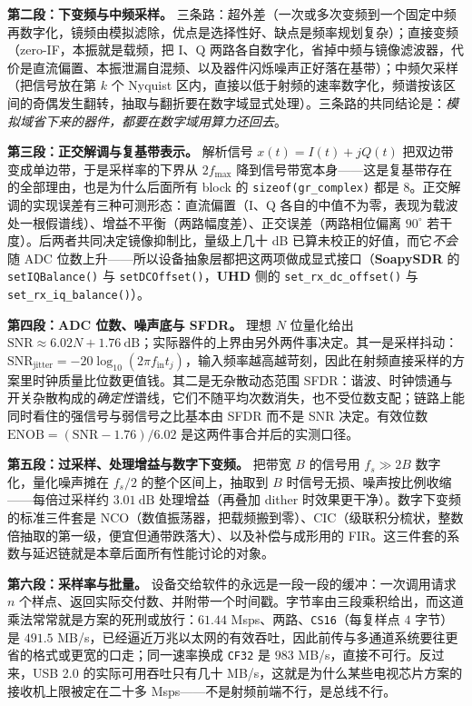\documentclass[12pt,a4paper,fontset=fandol]{ctexbook}
\newcommand{\Fn}[1]{\texttt{#1()}}
\newcommand{\Tp}[1]{\texttt{#1}}
\newcommand{\Bk}{\allowbreak}
\newcommand{\Lib}[1]{\textbf{#1}}
\begin{document}
\textbf{第二段：下变频与中频采样。} 三条路：超外差（一次或多次变频到一个固定中频再数字化，镜频由模拟滤除，优点是选择性好、缺点是频率规划复杂）；直接变频（zero-IF，本振就是载频，把 I、Q 两路各自数字化，省掉中频与镜像滤波器，代价是直流偏置、本振泄漏自混频、以及器件闪烁噪声正好落在基带）；中频欠采样（把信号放在第 $k$ 个 Nyquist 区内，直接以低于射频的速率数字化，频谱按该区间的奇偶发生翻转，抽取与翻折要在数字域显式处理）。三条路的共同结论是：\emph{模拟域省下来的器件，都要在数字域用算力还回去}。

\textbf{第三段：正交解调与复基带表示。} 解析信号 $x(t) = I(t) + jQ(t)$ 把双边带变成单边带，于是采样率的下界从 $2 f_{\max}$ 降到信号带宽本身——这是复基带存在的全部理由，也是为什么后面所有 block 的 \Tp{sizeof(gr\_complex)} \Bk{} 都是 $8$。正交解调的实现误差有三种可测形态：直流偏置（I、Q 各自的中值不为零，表现为载波处一根假谱线）、增益不平衡（两路幅度差）、正交误差（两路相位偏离 $90^\circ$ 若干度）。后两者共同决定镜像抑制比，量级上几十 dB 已算未校正的好值，而它\emph{不会}随 ADC 位数上升——所以设备抽象层都把这两项做成显式接口（\Lib{SoapySDR} 的 \Fn{setIQBalance} 与 \Fn{setDCOffset}，\Lib{UHD} 侧的 \Fn{set\_rx\_dc\_offset} 与 \Fn{set\_rx\_iq\_balance}）。

\textbf{第四段：ADC 位数、噪声底与 SFDR。} 理想 $N$ 位量化给出 $\text{SNR} \approx 6.02 N + 1.76\ \text{dB}$；实际器件的上界由另外两件事决定。其一是采样抖动：$\text{SNR}_{\text{jitter}} = -20\log_{10}(2\pi f_{\text{in}} t_j)$，输入频率越高越苛刻，因此在射频直接采样的方案里时钟质量比位数更值钱。其二是无杂散动态范围 SFDR：谐波、时钟馈通与开关杂散构成的\emph{确定性}谱线，它们不随平均次数消失，也不受位数支配；链路上能同时看住的强信号与弱信号之比基本由 SFDR 而不是 SNR 决定。有效位数 $\text{ENOB} = (\text{SNR} - 1.76)/6.02$ 是这两件事合并后的实测口径。

\textbf{第五段：过采样、处理增益与数字下变频。} 把带宽 $B$ 的信号用 $f_s \gg 2B$ 数字化，量化噪声摊在 $f_s/2$ 的整个区间上，抽取到 $B$ 时信号无损、噪声按比例收缩——每倍过采样约 $3.01\ \text{dB}$ 处理增益（再叠加 dither 时效果更干净）。数字下变频的标准三件套是 NCO（数值振荡器，把载频搬到零）、CIC（级联积分梳状，整数倍抽取的第一级，便宜但通带跌落大）、以及补偿与成形用的 FIR。这三件套的系数与延迟链就是本章后面所有性能讨论的对象。

\textbf{第六段：采样率与批量。} 设备交给软件的永远是一段一段的缓冲：一次调用请求 $n$ 个样点、返回实际交付数、并附带一个时间戳。字节率由三段乘积给出，而这道乘法常常就是方案的死刑或放行：$61.44$ Msps、两路、\Tp{CS16}（每复样点 $4$ 字节）是 $491.5$ MB/s，已经逼近万兆以太网的有效吞吐，因此前传与多通道系统要往更省的格式或更宽的口走；同一速率换成 \Tp{CF32} 是 $983$ MB/s，直接不可行。反过来，USB 2.0 的实际可用吞吐只有几十 MB/s，这就是为什么某些电视芯片方案的接收机上限被定在二十多 Msps——不是射频前端不行，是总线不行。
\end{document}

